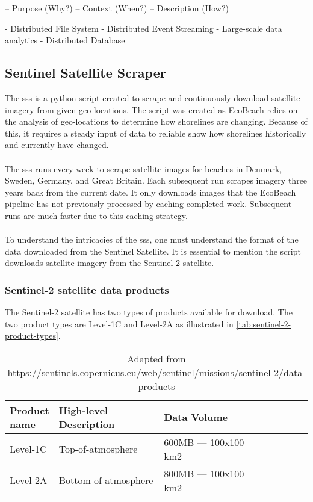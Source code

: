 – Purpose (Why?)
– Context (When?)
– Description (How?)

- Distributed File System
- Distributed Event Streaming
- Large-scale data analytics
- Distributed Database

\subsection{Sentinel Satellite Scraper}\label{subsec:sentinel-satellite-scraper}
The \acrfull{sss} is a python script created to scrape and continuously download satellite imagery from given geo-locations. The script was created as EcoBeach relies on the analysis of geo-locations to determine how shorelines are changing. Because of this, it requires a steady input of data to reliable show how shorelines historically and currently have changed.\\\\
\noindent
The \acrshort{sss} runs every week to scrape satellite images for beaches in Denmark, Sweden, Germany, and Great Britain. Each subsequent run scrapes imagery three years back from the current date. It only downloads images that the EcoBeach pipeline has not previously processed by caching completed work. Subsequent runs are much faster due to this caching strategy. \\\\
\noindent
To understand the intricacies of the \acrshort{sss}, one must understand the format of the data downloaded from the Sentinel Satellite. It is essential to mention the script downloads satellite imagery from the Sentinel-2 satellite.

\subsubsection{Sentinel-2 satellite data products}

The Sentinel-2 satellite has two types of products available for download. The two product types are Level-1C and Level-2A as illustrated in \autoref{tab:sentinel-2-product-types}.

\begin{table}[h!]
    \centering
    \begin{tabular}{| p{0.15\linewidth} | p{0.35\linewidth} | p{0.35\linewidth} |p{0.15\linewidth} |}
        \hline
        \textbf{Product name} & \textbf{High-level Description} & \textbf{Data Volume} \\ \hline
        Level-1C              & Top-of-atmosphere               & 600MB — 100x100 km2  \\\hline
        Level-2A              & Bottom-of-atmosphere            & 800MB — 100x100 km2  \\\hline
    \end{tabular}
    \caption{Adapted from https://sentinels.copernicus.eu/web/sentinel/missions/sentinel-2/data-products}
    \label{tab:sentinel-2-product-types}
\end{table}

